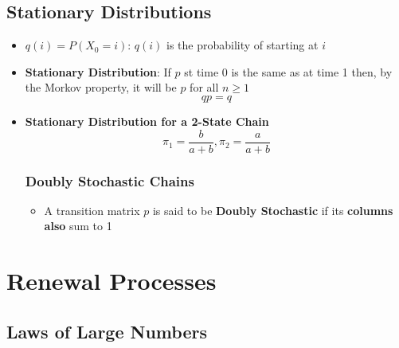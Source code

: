 \documentclass{report}
\begin{document}
\section{Stationary Distributions}%
  \begin{itemize}
    \item $q(i) = P(X_0 = i)$: $q(i)$ is the probability of starting at $i$
    \item  \textbf{Stationary Distribution}: If $p$ st time 0 is the same as
      at time 1 then, by the Morkov property, it will be $p$ for all $n \geq 1$
      \[ qp = q \]
    \item \textbf{Stationary Distribution for a 2-State Chain}
      \[ \pi_1 = \frac{b}{a+b} , \pi_2 = \frac{a}{a+b} \]
    \subsection{Doubly Stochastic Chains}%
    \label{sub:Doubly Stochastic Chains}
    \begin{itemize}
      \item A transition matrix $p$ is said to be \textbf{Doubly Stochastic}
        if its \textbf{columns also} sum to 1
    \end{itemize}

  \end{itemize}


\chapter{Renewal Processes}
\section{Laws of Large Numbers}
\end{document}
